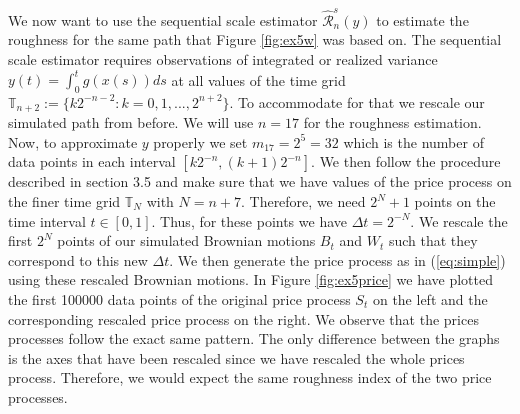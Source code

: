\documentclass{article}
\begin{document}
We now want to use the sequential scale estimator $\hat{\mathscr{R}}_n^s (y)$ to estimate the roughness for the same path that Figure \ref{fig:ex5w} was based on. The sequential scale estimator requires observations of integrated or realized variance $y(t) = \int_0^t g\left(x(s)\right) ds$ at all values of the time grid $\mathbb{T}_{n+2}:= \{k 2^{-n-2} : k=0,1,...,2^{n+2}\}$. To accommodate for that we rescale our simulated path from before. We will use $n=17$ for the roughness estimation. Now, to approximate $y$ properly we set $m_{17} = 2^5 = 32$ which is the number of data points in each interval $[k2^{-n},(k+1)2^{-n}]$. We then follow the procedure described in section 3.5 and make sure that we have values of the price process on the finer time grid $\mathbb{T}_{N}$ with $N=n+7$. Therefore, we need $2^N+1$ points on the time interval $t\in[0,1]$. Thus, for these points we have $\Delta t = 2^{-N}$. We rescale the first $2^N$ points of our simulated Brownian motions $B_t$ and $W_t$ such that they correspond to this new $\Delta t$. We then generate the price process as in (\ref{eq:simple}) using these rescaled Brownian motions. In Figure \ref{fig:ex5price} we have plotted the first 100000 data points of the original price process $S_t$ on the left and the corresponding rescaled price process on the right. We observe that the prices processes follow the exact same pattern. The only difference between the graphs is the axes that have been rescaled since we have rescaled the whole prices process. Therefore, we would expect the same roughness index of the two price processes. 
\end{document}
